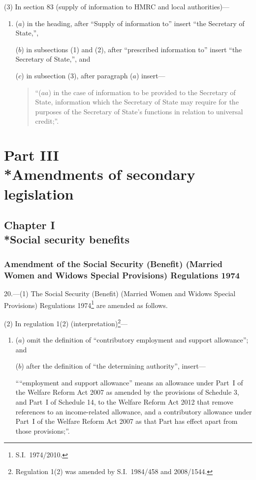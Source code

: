 \documentclass[12pt,a4paper]{article}
\begin{document}
(3) In section 83 (supply of information to HMRC and local authorities)—
\begin{enumerate}\item[]
($a$) in the heading, after “Supply of information to” insert “the Secretary of State,”,

($b$) in subsections (1) and (2), after “prescribed information to” insert “the Secretary of State,”, and

($c$) in subsection (3), after paragraph ($a$)  insert—
\begin{quotation}
“($aa$) in the case of information to be provided to the Secretary of State, information which the Secretary of State may require for the purposes of the Secretary of State’s functions in relation to universal credit;”.
\end{quotation}
\end{enumerate}

\section[Part III --- Amendments of secondary legislation]{Part III\\*Amendments of secondary legislation}

\subsection[Chapter I --- Social security benefits]{Chapter I\\*Social security benefits}

\renewcommand\parthead{--- Part III Chapter I}

\subsubsection[20. Amendment of the Social Security (Benefit) (Married Women and Widows Special Provisions) Regulations 1974]{Amendment of the Social Security (Benefit) (Married Women and Widows Special Provisions) Regulations 1974}

20.—(1) The Social Security (Benefit) (Married Women and Widows Special Provisions) Regulations 1974\footnote{S.I.~1974/2010.} are amended as follows.

(2) In regulation 1(2) (interpretation)\footnote{Regulation 1(2) was amended by S.I.~1984/458 and 2008/1544.}—
\begin{enumerate}\item[]
($a$) omit the definition of “contributory employment and support allowance”; and

($b$) after the definition of “the determining authority”, insert—

““employment and support allowance” means an allowance under Part~I of the Welfare Reform Act 2007 as amended by the provisions of Schedule 3, and Part~I of Schedule 14, to the Welfare Reform Act 2012 that remove references to an income-related allowance, and a contributory allowance under Part~I of the Welfare Reform Act 2007 as that Part has effect apart from those provisions;”.
\end{enumerate}
\end{document}
